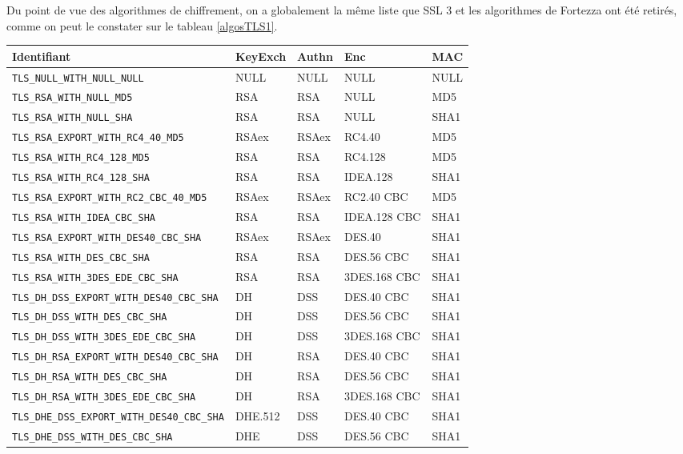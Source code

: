 Du point de vue des algorithmes de chiffrement, on a globalement la même liste que SSL 3 et les algorithmes de Fortezza ont été retirés, comme on peut le constater sur le tableau \ref{algosTLS1}.

\begin{table}[H]
\centering
\begin{tabularx}{17cm}{|l|l|l|X|l|}
\hline
\textbf{Identifiant} & \textbf{KeyExch} & \textbf{Authn}& \textbf{Enc}& \textbf{MAC}\\
\hline
\verb+TLS_NULL_WITH_NULL_NULL+&NULL&NULL&NULL&NULL\\
\hline
\verb+TLS_RSA_WITH_NULL_MD5+&RSA&RSA&NULL&MD5\\
\hline 
\verb+TLS_RSA_WITH_NULL_SHA+&RSA&RSA&NULL&SHA1\\
\hline 
\verb+TLS_RSA_EXPORT_WITH_RC4_40_MD5+&RSAex&RSAex&RC4.40&MD5\\
\hline
\verb+TLS_RSA_WITH_RC4_128_MD5+&RSA&RSA&RC4.128&MD5\\
\hline
\verb+TLS_RSA_WITH_RC4_128_SHA+ &RSA&RSA&IDEA.128&SHA1\\
\hline
\verb+TLS_RSA_EXPORT_WITH_RC2_CBC_40_MD5+&RSAex&RSAex&RC2.40 CBC&MD5 \\
\hline
\verb+TLS_RSA_WITH_IDEA_CBC_SHA+& RSA&RSA&IDEA.128 CBC&SHA1\\
\hline
\verb+TLS_RSA_EXPORT_WITH_DES40_CBC_SHA+&RSAex&RSAex&DES.40&SHA1\\
\hline
\verb+TLS_RSA_WITH_DES_CBC_SHA+& RSA&RSA&DES.56 CBC&SHA1\\
\hline
\verb+TLS_RSA_WITH_3DES_EDE_CBC_SHA+& RSA&RSA&3DES.168 CBC&SHA1\\
\hline
\verb+TLS_DH_DSS_EXPORT_WITH_DES40_CBC_SHA+&DH&DSS&DES.40 CBC&SHA1\\
\hline
\verb+TLS_DH_DSS_WITH_DES_CBC_SHA+ & DH&DSS&DES.56 CBC&SHA1\\
\hline 
\verb+TLS_DH_DSS_WITH_3DES_EDE_CBC_SHA+ & DH&DSS&3DES.168 CBC&SHA1\\
\hline
\verb+TLS_DH_RSA_EXPORT_WITH_DES40_CBC_SHA+ & DH&RSA&DES.40 CBC&SHA1\\
\hline
\verb+TLS_DH_RSA_WITH_DES_CBC_SHA+ & DH&RSA&DES.56 CBC&SHA1\\
\hline
\verb+TLS_DH_RSA_WITH_3DES_EDE_CBC_SHA+ & DH&RSA&3DES.168 CBC&SHA1\\
\hline
\verb+TLS_DHE_DSS_EXPORT_WITH_DES40_CBC_SHA+ & DHE.512&DSS&DES.40 CBC&SHA1\\
\hline
\verb+TLS_DHE_DSS_WITH_DES_CBC_SHA+ & DHE&DSS&DES.56 CBC&SHA1\\

\end{tabularx}
\end{table}
